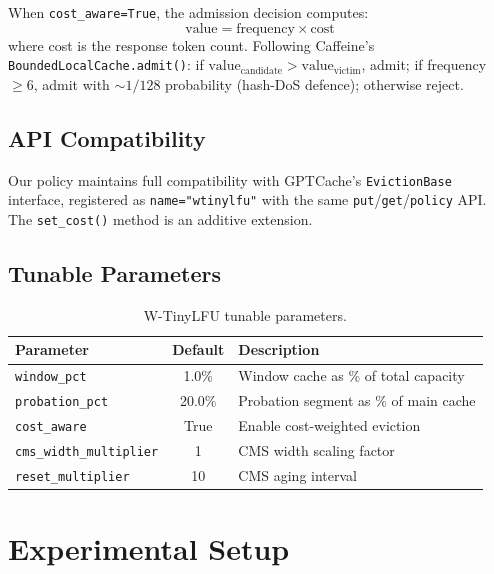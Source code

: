 \documentclass[11pt,a4paper]{article}
\begin{document}
When \texttt{cost\_aware=True}, the admission decision computes:
\[
\text{value} = \text{frequency} \times \text{cost}
\]
where cost is the response token count.
Following Caffeine's \texttt{BoundedLocalCache.admit()}: if $\text{value}_\text{candidate} > \text{value}_\text{victim}$, admit; if frequency $\geq 6$, admit with ${\sim}1/128$ probability (hash-DoS defence); otherwise reject.

\subsection{API Compatibility}

Our policy maintains full compatibility with GPTCache's \texttt{EvictionBase} interface, registered as \texttt{name="wtinylfu"} with the same \texttt{put}/\texttt{get}/\texttt{policy} API.
The \texttt{set\_cost()} method is an additive extension.

\subsection{Tunable Parameters}

\begin{table}[H]
\centering
\caption{W-TinyLFU tunable parameters.}
\label{tab:params}
\small
\begin{tabular}{@{} l c l @{}}
\toprule
\textbf{Parameter} & \textbf{Default} & \textbf{Description} \\
\midrule
\texttt{window\_pct}          & 1.0\%  & Window cache as \% of total capacity \\
\texttt{probation\_pct}       & 20.0\% & Probation segment as \% of main cache \\
\texttt{cost\_aware}          & True   & Enable cost-weighted eviction \\
\texttt{cms\_width\_multiplier} & 1    & CMS width scaling factor \\
\texttt{reset\_multiplier}    & 10     & CMS aging interval \\
\bottomrule
\end{tabular}
\end{table}

\section{Experimental Setup}
\end{document}
